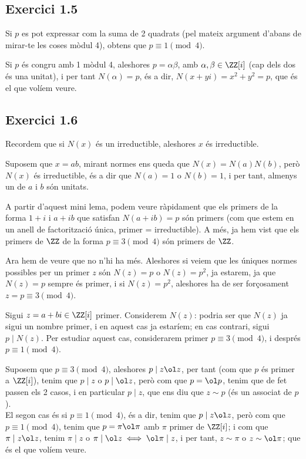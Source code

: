\documentclass[11pt, a4paper]{article}
\begin{document}
    \subsection{Exercici 1.5}
    Si $p$ es pot expressar com la suma de 2 quadrats (pel mateix argument d'abans de mirar-te les coses mòdul 4), obtens que $p\equiv 1\pmod4$.\par
    Si $p$ és congru amb 1 mòdul 4, aleshores $p=\alpha\beta$, amb $\alpha, \beta\in \ZZ[i]$ (cap dels dos és una unitat), i per tant $N(\alpha)=p$, és a dir, $N(x+yi)=x^2+y^2=p$, que és el que volíem veure.
    \subsection{Exercici 1.6}
    Recordem que si $N(x)$ és un irreductible, aleshores $x$ és irreductible.
    \begin{dem}
        Suposem que $x=ab$, mirant normes ens queda que $N(x)=N(a)N(b)$, però $N(x)$ és irreductible, és a dir que $N(a)=1$ o $N(b)=1$, i per tant, almenys un de $a$ i $b$ són unitats.
    \end{dem}
    A partir d'aquest mini lema, podem veure ràpidament que els primers de la forma $1+i$ i $a+ib$ que satisfan $N(a+ib)=p$ són primers (com que estem en un anell de factorització única, primer = irreductible). A més, ja hem vist que els primers de $\ZZ$ de la forma $p\equiv3\pmod4$ són primers de $\ZZ$.\par
    Ara hem de veure que no n'hi ha més. Aleshores si veiem que les úniques normes possibles per un primer $z$ són $N(z)=p$ o $N(z)=p^2$, ja estarem, ja que $N(z)=p$ sempre és primer, i si $N(z)=p^2$, aleshores ha de ser forçosament $z=p\equiv3\pmod4$.\par
    Sigui $z=a+bi\in \ZZ[i]$ primer. Considerem $N(z)$: podria ser que $N(z)$ ja sigui un nombre primer, i en aquest cas ja estaríem; en cas contrari, sigui $p\mid N(z)$. Per estudiar aquest cas, considerarem primer $p\equiv3\pmod 4$, i després $p\equiv 1\pmod 4$.\par
    Suposem que $p\equiv 3\pmod4$, aleshores $p\mid z\ol z$, per tant (com que $p$ és primer a $\ZZ[i]$), tenim que $p\mid z$ o $p\mid \ol z$, però com que $p=\ol p$, tenim que de fet passen els 2 casos, i en particular $p\mid z$, que ens diu que $z\sim p$ (és un associat de $p$).\\
    El segon cas és si \underline{$p\equiv 1\pmod 4$}, és a dir, tenim que $p\mid z\ol z$, però com que $p\equiv 1\pmod 4$, tenim que $p=\pi\ol\pi$ amb $\pi$ primer de $\ZZ[i]$; i com que $\pi\mid z\ol z$, tenim $\pi\mid z$ o $\pi\mid \ol z\iff \ol\pi\mid z$, i per tant, $z\sim \pi$ o $z\sim \ol\pi$; que és el que volíem veure.
\end{document}
